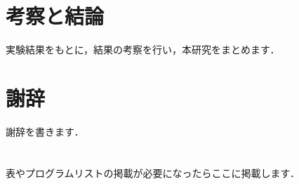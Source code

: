\documentclass{suribt}
\begin{document}
\chapter{考察と結論}
実験結果をもとに，結果の考察を行い，本研究をまとめます．

\backmatter
\chapter{謝辞}
謝辞を書きます．

\begin{thebibliography}{}
 \bibitem{}
 \bibitem{}
\end{thebibliography}

\appendix
\chapter{}
表やプログラムリストの掲載が必要になったらここに掲載します．
\end{document}
